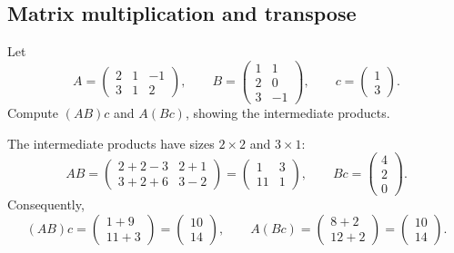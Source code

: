\subsection*{Matrix multiplication and transpose}

\begin{problem}\label{ex:01:rectangular-associativity}
Let
\[
A=\begin{pmatrix}2&1&-1\\3&1&2\end{pmatrix},\qquad
B=\begin{pmatrix}1&1\\2&0\\3&-1\end{pmatrix},\qquad
c=\begin{pmatrix}1\\3\end{pmatrix}.
\]
Compute $(AB)c$ and $A(Bc)$, showing the intermediate products.
\end{problem}
\begin{solution}
The intermediate products have sizes $2\times2$ and $3\times1$:
\[
AB=\begin{pmatrix}2+2-3&2+1\\3+2+6&3-2\end{pmatrix}
=\begin{pmatrix}1&3\\11&1\end{pmatrix},
\qquad Bc=\begin{pmatrix}4\\2\\0\end{pmatrix}.
\]
Consequently,
\[
(AB)c=\begin{pmatrix}1+9\\11+3\end{pmatrix}
=\begin{pmatrix}10\\14\end{pmatrix},
\qquad
A(Bc)=\begin{pmatrix}8+2\\12+2\end{pmatrix}
=\begin{pmatrix}10\\14\end{pmatrix}.
\]
\end{solution}

